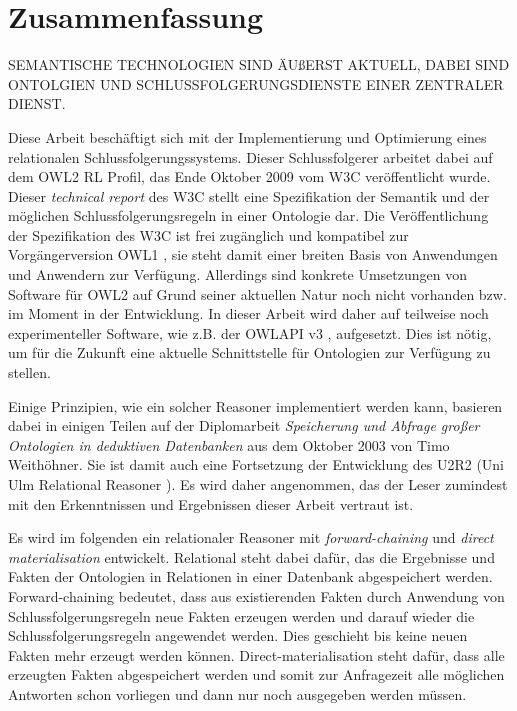\section*{Zusammenfassung}
SEMANTISCHE TECHNOLOGIEN SIND ÄUßERST AKTUELL, DABEI SIND ONTOLGIEN UND SCHLUSSFOLGERUNGSDIENSTE EINER ZENTRALER DIENST. %

Diese Arbeit beschäftigt sich mit der Implementierung und Optimierung eines relationalen Schlussfolgerungssystems. Dieser Schlussfolgerer arbeitet dabei auf dem OWL2 RL Profil, das Ende Oktober 2009 vom W3C \cite{OWL2Profiles} veröffentlicht wurde. Dieser \emph{technical report} des W3C stellt eine Spezifikation der Semantik und der möglichen Schlussfolgerungsregeln in einer Ontologie dar. Die Veröffentlichung der Spezifikation des W3C ist frei zugänglich und kompatibel zur Vorgängerversion OWL1 \cite{OWL1}, sie steht damit einer breiten Basis von Anwendungen und Anwendern zur Verfügung. Allerdings sind konkrete Umsetzungen von Software für OWL2 auf Grund seiner aktuellen Natur noch nicht vorhanden bzw. im Moment in der Entwicklung. In dieser Arbeit wird daher auf teilweise noch experimenteller Software, wie z.B. der OWLAPI v3 \cite{OWLAPI}, aufgesetzt. Dies ist nötig, um für die Zukunft eine aktuelle Schnittstelle für Ontologien zur Verfügung zu stellen.

Einige Prinzipien, wie ein solcher Reasoner implementiert werden kann, basieren dabei in einigen Teilen auf der Diplomarbeit \emph{Speicherung und Abfrage großer Ontologien in deduktiven Datenbanken} \cite{Weithoehner2003} aus dem Oktober 2003 von Timo Weithöhner. Sie ist damit auch eine Fortsetzung der Entwicklung des U2R2 (Uni Ulm Relational Reasoner \cite{Weithoehner2008}). Es wird daher angenommen, das der Leser zumindest mit den Erkenntnissen und Ergebnissen dieser Arbeit vertraut ist.

Es wird im folgenden ein relationaler Reasoner mit \emph{forward-chaining} und \emph{direct materialisation} entwickelt. Relational steht dabei dafür, das die Ergebnisse und Fakten der Ontologien in Relationen in einer Datenbank abgespeichert werden. Forward-chaining bedeutet, dass aus existierenden Fakten durch Anwendung von Schlussfolgerungsregeln neue Fakten erzeugen werden und darauf wieder die Schlussfolgerungsregeln angewendet werden. Dies geschieht bis keine neuen Fakten mehr erzeugt werden können. Direct-materialisation steht dafür, dass alle erzeugten Fakten abgespeichert werden und somit zur Anfragezeit alle möglichen Antworten schon vorliegen und dann nur noch ausgegeben werden müssen.

